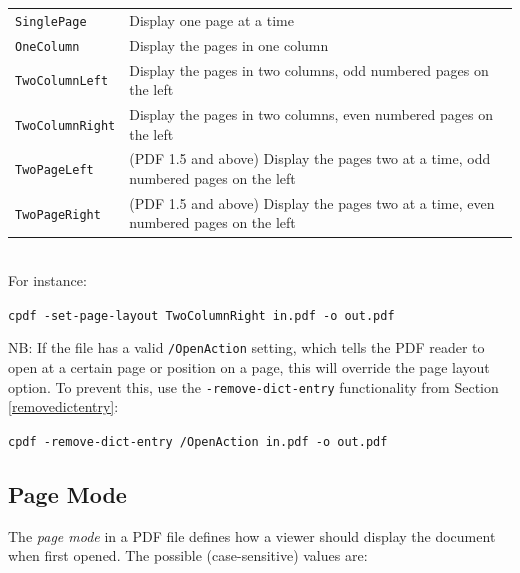 \documentclass{book}
\begin{document}
\vspace{2mm}
  {\small\begin{tabular}{ll}
    \texttt{SinglePage} & \vspace{2mm} \parbox{8cm}{Display one page at a time} \\
    \texttt{OneColumn} & \vspace{2mm} \parbox{8cm}{Display the pages in one column} \\
    \texttt{TwoColumnLeft} & \vspace{2mm} \parbox{8cm}{Display the pages in two columns, odd numbered pages on the left} \\
    \texttt{TwoColumnRight} & \vspace{2mm} \parbox{8cm}{Display the pages in two columns, even numbered pages on the left} \\
    \texttt{TwoPageLeft} & \vspace{2mm} \parbox{8cm}{(PDF 1.5 and above) Display the pages two at a time, odd numbered pages on the left} \\
    \texttt{TwoPageRight} & \vspace{2mm} \parbox{8cm}{(PDF 1.5 and above) Display the pages two at a time, even numbered pages on the left}
  \end{tabular}}\\

  \noindent For instance:
  \begin{framed}
    \noindent\small\verb!cpdf -set-page-layout TwoColumnRight in.pdf -o out.pdf!
  \end{framed}
  
\noindent NB: If the file has a valid \texttt{/OpenAction} setting, which tells the PDF reader to open at a certain page or position on a page, this will override the page layout option. To prevent this, use the \texttt{-remove-dict-entry} functionality from Section \ref{removedictentry}:

  \begin{framed}
    \noindent\small\verb!cpdf -remove-dict-entry /OpenAction in.pdf -o out.pdf!
  \end{framed}

  \subsection{Page Mode}
  The \textit{page mode} in a PDF file defines how a viewer should display the
document when first opened. The possible (case-sensitive) values are:
\end{document}
